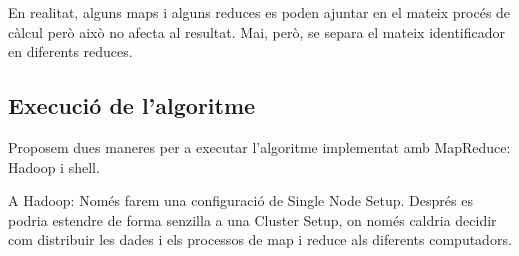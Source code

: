 \todo{} En realitat, alguns maps i alguns reduces es poden ajuntar en
el mateix procés de càlcul però això no afecta al resultat. Mai, però,
se separa el mateix identificador en diferents reduces.




\subsection{Execució de l'algoritme}

Proposem dues maneres per a executar l'algoritme implementat amb
MapReduce: Hadoop i shell.  


A Hadoop:\todo{}
Només farem una configuració de Single Node Setup. 
Després es podria estendre de forma senzilla a una Cluster Setup, on
només caldria decidir com distribuir les dades i els processos de map
i reduce als diferents computadors.


